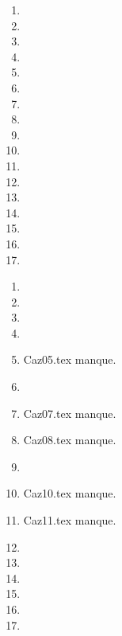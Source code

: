  
 
\begin{enumerate}
  \item  
  \item  
  \item  
  \item  
  \item  
  \item  
  \item  
  \item  
  \item  
  \item  
  \item  
  \item  
  \item  
  \item  
  \item  
  \item  
  \item  
\end{enumerate} 
\clearpage 
{}
\begin{enumerate}
  \item  
  \item  
  \item  
  \item  
  \item Caz05.tex manque. 
  \item  
  \item Caz07.tex manque. 
  \item Caz08.tex manque. 
  \item  
  \item Caz10.tex manque. 
  \item Caz11.tex manque. 
  \item  
  \item  
  \item  
  \item  
  \item  
  \item  
\end{enumerate} 
